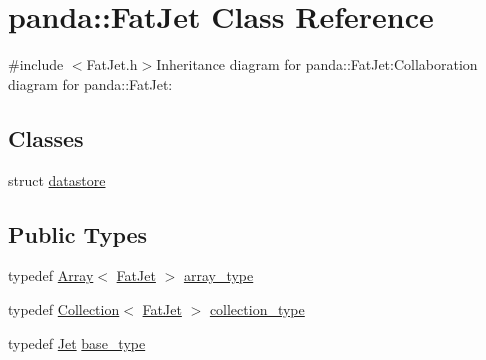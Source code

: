 \hypertarget{classpanda_1_1FatJet}{
\section{panda::FatJet Class Reference}
\label{classpanda_1_1FatJet}
}


{\ttfamily \#include $<$FatJet.h$>$}Inheritance diagram for panda::FatJet:Collaboration diagram for panda::FatJet:\subsection*{Classes}
\begin{DoxyCompactItemize}
\item 
struct \hyperlink{structpanda_1_1FatJet_1_1datastore}{datastore}
\end{DoxyCompactItemize}
\subsection*{Public Types}
\begin{DoxyCompactItemize}
\item 
typedef \hyperlink{classpanda_1_1Array}{Array}$<$ \hyperlink{classpanda_1_1FatJet}{FatJet} $>$ \hyperlink{classpanda_1_1FatJet_af8c5781a44a91eb012c01dde2a710039}{array\_\-type}
\item 
typedef \hyperlink{classpanda_1_1Collection}{Collection}$<$ \hyperlink{classpanda_1_1FatJet}{FatJet} $>$ \hyperlink{classpanda_1_1FatJet_a2740a440685d1d581f92bcedbf1a6f9e}{collection\_\-type}
\item 
typedef \hyperlink{classpanda_1_1Jet}{Jet} \hyperlink{classpanda_1_1FatJet_ab06dcce3d9c117c93a036c87fb441795}{base\_\-type}
\end{DoxyCompactItemize}

